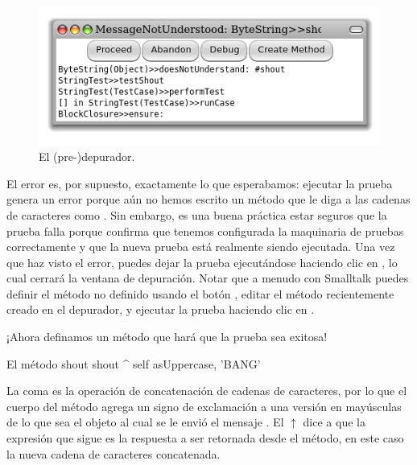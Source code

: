 \documentclass[a4paper,10pt,twoside]{book}
\begin{document}
\begin{figure}[hbt]
\centerline {\includegraphics[width=\textwidth]{Predebugger}}
\caption{El (pre-)depurador.}
\end{figure}

El error es, por supuesto, exactamente lo que esperabamos: ejecutar la prueba genera un error porque a\'un no hemos escrito un m\'etodo que le diga a las cadenas de caracteres como .
Sin embargo, es una buena pr\'actica estar seguros que la prueba falla porque confirma que tenemos configurada la maquinaria de pruebas correctamente y que la nueva prueba est\'a realmente siendo ejecutada.
Una vez que haz visto el error, puedes dejar la prueba ejecut\'andose haciendo clic en , lo cual cerrar\'a la ventana de depuraci\'on.
Notar que a menudo con Smalltalk puedes definir el m\'etodo no definido usando el bot\'on , editar el m\'etodo recientemente creado en el depurador, y ejecutar la prueba haciendo clic en .

¡Ahora definamos un m\'etodo que har\'a que la prueba sea exitosa!

\begin{method}[shout]{El m\'etodo shout}
shout
	^ self asUppercase, 'BANG'
\end{method}

La coma es la operaci\'on de concatenaci\'on de cadenas de caracteres, por lo que el cuerpo del m\'etodo agrega un signo de exclamaci\'on a una versi\'on en may\'usculas de lo que sea el objeto  al cual se le envi\'o el mensaje .
El $\uparrow$ dice a \pharo que la expresi\'on que sigue es la respuesta a ser retornada desde el m\'etodo, en este caso la nueva cadena de caracteres concatenada.
\end{document}
